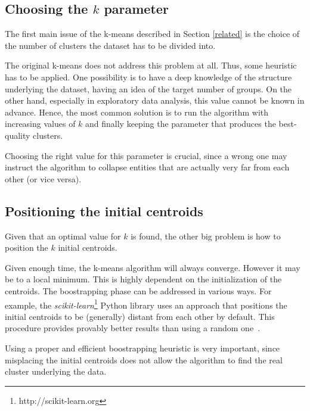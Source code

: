 \subsection*{Choosing the $k$ parameter}
The first main issue of the k-means described in Section \ref{related} is the choice
of the number of clusters the dataset has to be divided into.

The original k-means does not address this problem at all. Thus, some heuristic has to
be applied. One possibility is to have a deep knowledge of the structure underlying the
dataset, having an idea of the target number of groups. On the other hand, especially 
in exploratory data analysis, this value cannot be known in advance.
Hence, the most common solution is to run the algorithm with increasing values of $k$ and
finally keeping the parameter that produces the best-quality clusters.

Choosing the right value for this parameter is crucial, since a wrong one may
instruct the algorithm to collapse entities that are actually very far from each other
(or vice versa).


\subsection*{Positioning the initial centroids}
Given that an optimal value for $k$ is found, the other big problem is how to position the $k$ 
initial centroids.

Given enough time, the k-means algorithm will always converge. However it may be to a local 
minimum. This is highly dependent on the initialization of the centroids. The boostrapping
phase can be addressed in various ways. For example, the 
\emph{scikit-learn}\footnote{http://scikit-learn.org} Python library 
uses an approach that positions the initial centroids to be (generally) distant
from each other by default. This procedure provides provably better results than using a random 
one~\cite{arthur2007k}.

Using a proper and efficient boostrapping heuristic is very important, since misplacing 
the initial centroids does not allow the algorithm to find the real cluster underlying
the data.
